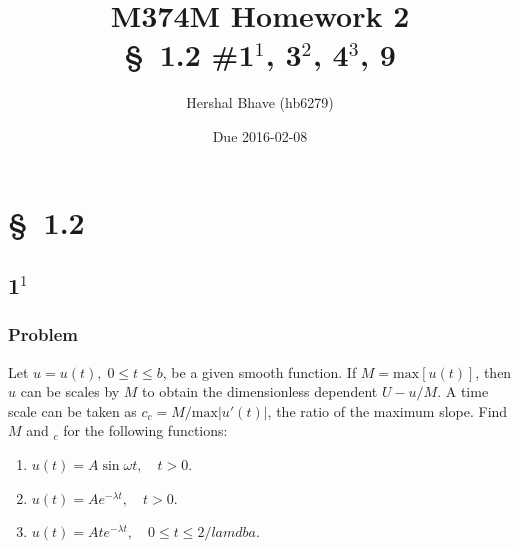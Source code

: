 \documentclass[12pt]{article}
\title{M374M Homework 2 \\
  \normalsize{\S~1.2 \#1$^1$, 3$^2$, 4$^3$, 9}}
\author{Hershal Bhave (hb6279)}
\date{Due 2016-02-08}
\begin{document}
\maketitle

\section{\S~1.2}
\subsection{1$^1$}

\subsubsection*{Problem}
Let $u=u(t),\;0 \le t \le b$, be a given smooth function. If
$M=\text{max}[u(t)]$, then $u$ can be scales by $M$ to obtain the dimensionless
dependent $U-u/M$. A time scale can be taken as $c_c=M/\text{max}|u'(t)|$, the
ratio of the maximum slope. Find $M$ and $_c$ for the following functions:
\begin{enumerate}
\item $u(t)=A\sin\omega t, \quad t>0$.
\item $u(t)=Ae^{-\lambda t},\quad t>0$.
\item $u(t)=Ate^{-\lambda t},\quad 0 \le t \le 2/lamdba.$
\end{enumerate}
\end{document}
